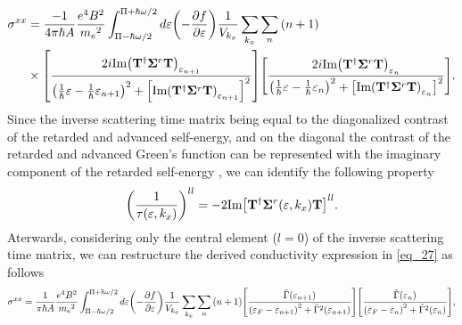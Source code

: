 \begin{widetext}
\begin{equation}
  \begin{aligned}
    {\sigma}^{xx} & =
    \frac{-1}{4\pi\hbar A}
    \frac{e^4B^2}{{{m_e}^2}}
    \int_{\Pi-\hbar\omega/2}^{\Pi+ \hbar\omega/2} d\varepsilon
    \qty(
    -\frac{\partial f}{\partial \varepsilon})
    \frac{1}{V_{k_x}} \sum_{k_x} \sum_{n}
    \qty(n+1)
    \\
    & \times
    \qty[
    \frac{2i \text{Im}\qty(\vb{T}^{\dagger} \vb{\Sigma}^r \vb{T})_{\varepsilon_{n+1}}
    }
    {
    \qty(
    \frac{1}{\hbar}\varepsilon -
    \frac{1}{\hbar}\varepsilon_{n+1}
    )^2
    + \qty[\text{Im}\qty(\vb{T}^{\dagger} \vb{\Sigma}^r \vb{T})_{\varepsilon_{n+1}}]^2
    }]
    \qty[
    \frac{2i \text{Im}\qty(\vb{T}^{\dagger} \vb{\Sigma}^r \vb{T})_{\varepsilon_{n}}
    }
    {
    \qty(
    \frac{1}{\hbar}\varepsilon -
    \frac{1}{\hbar}\varepsilon_{n}
    )^2
    + \qty[\text{Im}\qty(\vb{T}^{\dagger} \vb{\Sigma}^r \vb{T})_{\varepsilon_{n}}]^2
    }].
  \end{aligned}
\end{equation}
Since the inverse scattering time matrix being equal to the diagonalized contrast of the retarded and advanced self-energy, and on the diagonal the contrast of the retarded and advanced Green's function can be represented with the imaginary component of the retarded self-energy \cite{wackerl20,wackerlthesis20}, we can identify the following property
\begin{equation} \label{eq_28}
  \qty(\frac{1}{\tau(\varepsilon,k_x)})^{ll} =
  -2\text{Im}\qty[ \vb{T}^{\dagger} \vb{\Sigma}^r(\varepsilon,k_x) \vb{T}]^{ll}.
\end{equation}
Aterwards, considering only the central element ($l=0$) of the inverse scattering time matrix, we can restructure the derived conductivity expression in \ref{eq_27} as follows
\begin{equation} \label{eq_29}
    {\sigma}^{xx}   =
    \frac{1}{\pi\hbar A}
    \frac{e^4B^2}{{{m_e}^2}}
    \int_{\Pi-\hbar\omega/2}^{\Pi+ \hbar\omega/2} d\varepsilon
    \qty(
    -\frac{\partial f}{\partial \varepsilon})
    \frac{1}{V_{k_x}} \sum_{k_x} \sum_{n}
    \qty(n+1)
    \qty[
    \frac{\tilde{{\Gamma}}(\varepsilon_{n+1})
    }
    {
    \qty(
    \varepsilon_F - \varepsilon_{n+1}
    )^2
    + \tilde{{\Gamma}}^2(\varepsilon_{n+1})
    }]
    \qty[
    \frac{\tilde{{\Gamma}}(\varepsilon_{n})
    }
    {
    \qty(
    \varepsilon_F - \varepsilon_{n}
    )^2
    + \tilde{{\Gamma}}^2(\varepsilon_{n})
    }],
\end{equation}
\end{widetext}
